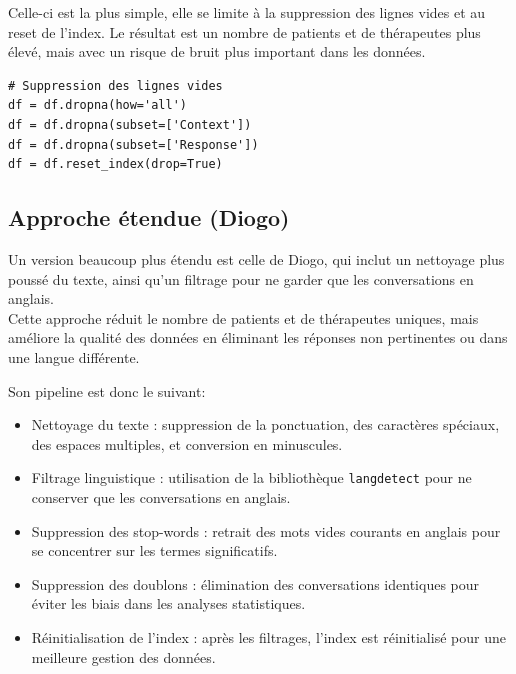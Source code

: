 \documentclass[12pt,a4paper]{report}
\begin{document}
Celle-ci est la plus simple, elle se limite à la suppression des lignes vides et au reset de l'index.
Le résultat est un nombre de patients et de thérapeutes plus élevé, mais avec un risque de bruit plus important dans les données.

\begin{lstlisting}
# Suppression des lignes vides
df = df.dropna(how='all')
df = df.dropna(subset=['Context'])
df = df.dropna(subset=['Response'])
df = df.reset_index(drop=True)
\end{lstlisting}

\subsection{Approche étendue (Diogo)}
Un version beaucoup plus étendu est celle de Diogo, qui inclut un nettoyage plus poussé du texte, 
ainsi qu'un filtrage pour ne garder que les conversations en anglais.\\
Cette approche réduit le nombre de patients et de thérapeutes uniques, 
mais améliore la qualité des données en éliminant les réponses non pertinentes ou 
dans une langue différente.

Son pipeline est donc le suivant:
\begin{itemize}
 \item Nettoyage du texte : suppression de la ponctuation, des caractères spéciaux, des espaces multiples, et conversion en minuscules.
 \item Filtrage linguistique : utilisation de la bibliothèque \texttt{langdetect} pour ne conserver que les conversations en anglais.
 \item Suppression des stop-words : retrait des mots vides courants en anglais pour se concentrer sur les termes significatifs.
 \item Suppression des doublons : élimination des conversations identiques pour éviter les biais dans les analyses statistiques.
 \item Réinitialisation de l'index : après les filtrages, l'index est réinitialisé pour une meilleure gestion des données.
\end{itemize}

\end{document}
